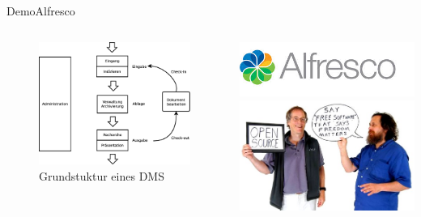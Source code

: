 \begin{frame}{Demo}{Alfresco}
		\begin{columns}
			\begin{column}{.50\textwidth}
				\begin{figure}
					\includegraphics[scale=0.18]{images/Grundstruktur_DMS}
					\caption[Grunstruktur-DMS]{Grundstuktur eines DMS \cite{Götzer2014}}
					\label{gdms}
				\end{figure}
			\end{column}
			\begin{column}{.5\textwidth}
				\centering
				\includegraphics[scale=0.3]{images/alfresco}
				\newline
				\includegraphics[scale=0.3]{images/FLOSS}
			\end{column}
		\end{columns}
\end{frame}